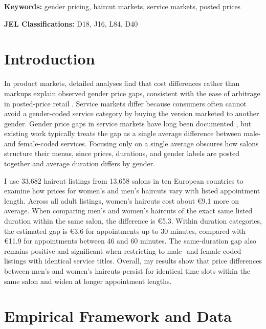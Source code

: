 \documentclass[12pt,a4paper]{article}
\begin{document}
\noindent
\textbf{Keywords:} gender pricing, haircut markets, service markets, posted prices

\noindent
\textbf{JEL Classifications:} D18, J16, L84, D40

\newpage


\section{Introduction}

In product markets, detailed analyses find that cost differences rather than markups explain observed gender price gaps, consistent with the ease of arbitrage in posted-price retail \citep{moshary2023gender, barnesbrounstein2024}. Service markets differ because consumers often cannot avoid a gender-coded service category by buying the version marketed to another gender. Gender price gaps in service markets have long been documented \citep{ukHairdressers, duesterhaus2011cost, Heiden2018-wc, Affairs2015FromCT}, but existing work typically treats the gap as a single average difference between male- and female-coded services. Focusing only on a single average obscures how salons structure their menus, since prices, durations, and gender labels are posted together and average duration differs by gender.

I use 33,682 haircut listings from 13,658 salons in ten European countries to examine how prices for women's and men's haircuts vary with listed appointment length. Across all adult listings, women's haircuts cost about €9.1 more on average. When comparing men's and women's haircuts of the exact same listed duration within the same salon, the difference is €5.3. Within duration categories, the estimated gap is €3.6 for appointments up to 30 minutes, compared with €11.9 for appointments between 46 and 60 minutes. The same-duration gap also remains positive and significant when restricting to male- and female-coded listings with identical service titles. Overall, my results show that price differences between men's and women's haircuts persist for identical time slots within the same salon and widen at longer appointment lengths.

\section{Empirical Framework and Data}
\end{document}
